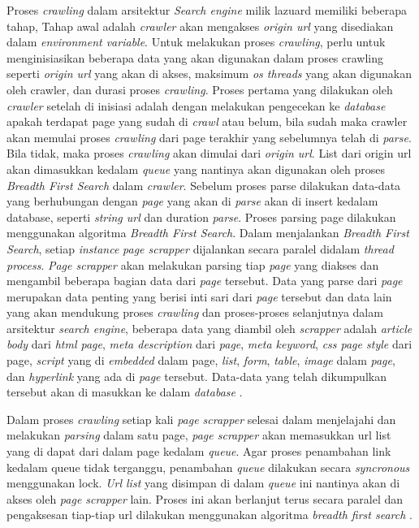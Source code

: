 Proses \emph{crawling} dalam arsitektur \emph{Search engine} milik lazuard memiliki beberapa tahap, Tahap awal adalah \emph{crawler} akan mengakses \emph{origin url} yang disediakan dalam \emph{environment variable}. Untuk melakukan proses \emph{crawling}, perlu untuk menginisiasikan beberapa data yang akan digunakan dalam proses crawling seperti \emph{origin url} yang akan di akses, maksimum \emph{os threads} yang akan digunakan oleh crawler, dan durasi proses \emph{crawling}. Proses pertama yang dilakukan oleh \emph{crawler} setelah di inisiasi adalah dengan melakukan pengecekan ke \emph{database} apakah terdapat page yang sudah di \emph{crawl} atau belum, bila sudah maka crawler akan memulai proses \emph{crawling} dari page terakhir yang sebelumnya telah di \emph{parse}. Bila tidak, maka proses \emph{crawling} akan dimulai dari \emph{origin url}. List dari origin url akan dimasukkan kedalam \emph{queue} yang nantinya akan digunakan oleh proses \emph{Breadth First Search} dalam \emph{crawler}. Sebelum proses parse dilakukan data-data yang berhubungan dengan \emph{page} yang akan di \emph{parse} akan di insert kedalam database, seperti \emph{string url} dan duration \emph{parse}. Proses parsing page dilakukan menggunakan algoritma \emph{Breadth First Search}. Dalam menjalankan \emph{Breadth First Search}, setiap \emph{instance} \emph{page scrapper} dijalankan secara paralel didalam \emph{thread process}. \emph{Page scrapper} akan melakukan parsing tiap \emph{page} yang diakses dan mengambil beberapa bagian data dari  \emph{page} tersebut. Data yang parse dari \emph{page} merupakan data penting yang berisi inti sari dari \emph{page} tersebut dan data lain yang akan mendukung proses \emph{crawling} dan proses-proses selanjutnya dalam arsitektur \emph{search engine}, beberapa data yang diambil oleh \emph{scrapper} adalah \emph{article body} dari \emph{html page}, \emph{meta description} dari \emph{page}, \emph{meta keyword}, \emph{css page style} dari page, \emph{script} yang di \emph{embedded} dalam page, \emph{list}, \emph{form}, \emph{table}, \emph{image} dalam \emph{page}, dan \emph{hyperlink} yang ada di \emph{page} tersebut. Data-data yang telah dikumpulkan tersebut akan di masukkan ke dalam \emph{database} \citep{lazuardithesis}.

Dalam proses \emph{crawling} setiap kali \emph{page scrapper} selesai dalam menjelajahi dan melakukan \emph{parsing} dalam satu page, \emph{page scrapper} akan memasukkan url list yang di dapat dari dalam page kedalam \emph{queue}. Agar proses penambahan link kedalam queue tidak terganggu, penambahan \emph{queue} dilakukan secara \emph{syncronous} menggunakan lock. \emph{Url list} yang disimpan di dalam \emph{queue} ini nantinya akan di akses oleh \emph{page scrapper} lain. Proses ini akan berlanjut terus secara paralel dan pengaksesan tiap-tiap url dilakukan menggunakan algoritma \emph{breadth first search} \citep{lazuardithesis}.

